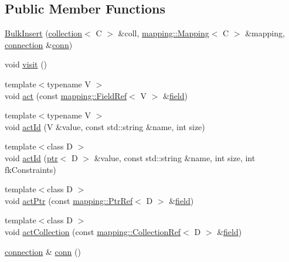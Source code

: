 \subsection*{Public Member Functions}
\begin{DoxyCompactItemize}
\item 
\hyperlink{classdbo_1_1action_1_1_bulk_insert_ad4b37ab837e9f85b5bda357dc8446ac2}{Bulk\+Insert} (\hyperlink{classdbo_1_1collection}{collection}$<$ C $>$ \&coll, \hyperlink{classdbo_1_1mapping_1_1_mapping}{mapping\+::\+Mapping}$<$ C $>$ \&mapping, \hyperlink{classdbo_1_1connection}{connection} \&\hyperlink{classdbo_1_1action_1_1_bulk_insert_a058df5bb17f965d776fa71daef2d4599}{conn})
\item 
void \hyperlink{classdbo_1_1action_1_1_bulk_insert_a930454811b943f4e7611b5277a33350b}{visit} ()
\item 
{\footnotesize template$<$typename V $>$ }\\void \hyperlink{classdbo_1_1action_1_1_bulk_insert_abe3f25b62b25ecb9c8e76d38896cc42a}{act} (const \hyperlink{classdbo_1_1mapping_1_1_field_ref}{mapping\+::\+Field\+Ref}$<$ V $>$ \&\hyperlink{namespacedbo_ad1f50f02cb050acf946807959252a93f}{field})
\item 
{\footnotesize template$<$typename V $>$ }\\void \hyperlink{classdbo_1_1action_1_1_bulk_insert_a97100925f5d66b2cdbb329fd8fdc07da}{act\+Id} (V \&value, const std\+::string \&name, int size)
\item 
{\footnotesize template$<$class D $>$ }\\void \hyperlink{classdbo_1_1action_1_1_bulk_insert_acd9e71d2a99198bfebbb574aeba45853}{act\+Id} (\hyperlink{classdbo_1_1ptr}{ptr}$<$ D $>$ \&value, const std\+::string \&name, int size, int fk\+Constraints)
\item 
{\footnotesize template$<$class D $>$ }\\void \hyperlink{classdbo_1_1action_1_1_bulk_insert_a1c7fcbf80882a177ae7012c8d5e89065}{act\+Ptr} (const \hyperlink{classdbo_1_1mapping_1_1_ptr_ref}{mapping\+::\+Ptr\+Ref}$<$ D $>$ \&\hyperlink{namespacedbo_ad1f50f02cb050acf946807959252a93f}{field})
\item 
{\footnotesize template$<$class D $>$ }\\void \hyperlink{classdbo_1_1action_1_1_bulk_insert_a91600b0c5e6d1c12c3b95872613b75f6}{act\+Collection} (const \hyperlink{classdbo_1_1mapping_1_1_collection_ref}{mapping\+::\+Collection\+Ref}$<$ D $>$ \&\hyperlink{namespacedbo_ad1f50f02cb050acf946807959252a93f}{field})
\item 
\hyperlink{classdbo_1_1connection}{connection} \& \hyperlink{classdbo_1_1action_1_1_bulk_insert_a058df5bb17f965d776fa71daef2d4599}{conn} ()
\end{DoxyCompactItemize}
